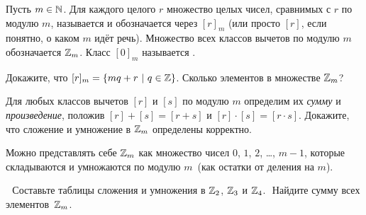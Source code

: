 \documentclass[a4paper, 11pt]{article}
\begin{document}


 Пусть $m\in\mathbb{N}$. 
Для  каждого целого $r$ множество целых чисел, сравнимых
с $r$ по модулю $m$, называется 
и обозначается через $[r]_m$ (или просто $[r]$, если понятно, о каком $m$ идёт
речь). Множество всех классов вычетов по  модулю $m$ обозначается $\mathbb{Z}_m$. Класс $[0]_m$
называется . 

  Докажите, что $[r]_m = \{mq + r\ |\ q\in\Z\}$.  Сколько
элементов в множестве $\mathbb{Z}_m$? 

 Для любых классов вычетов $[r]$ и $[s]$ по модулю $m$ определим
их {\it сумму}  и {\it произведение}, положив $[r] + [s] = [r + s]$ и
$[r]\cdot[s] = [r\cdot s]$. %
Докажите, что сложение и умножение в $\mathbb{Z}_m$ определены
корректно. 

 Можно представлять себе $\mathbb{Z}_m$ как множество
чисел $0$, $1$, $2$, \ldots, $m - 1$, которые складываются и
умножаются  по модулю $m$\ (как остатки от деления на $m$).







 $\!\!\!$
 $\!\!\!$
Составьте таблицы сложения и умножения в $\mathbb{Z}_2$, $\mathbb{Z}_3$ и $\mathbb{Z}_4$.
 $\!\!\!$
Найдите сумму всех элементов~$\mathbb{Z}_m$.

\end{document}
